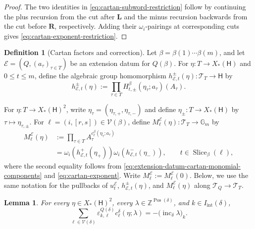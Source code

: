 \documentclass[10pt,a4paper]{article}
\newtheorem{lemma}[theorem]{Lemma}
\theoremstyle{definition}
\newtheorem{definition}[theorem]{Definition}
\theoremstyle{remark}
\newcommand{\Gm}{\mathbb G_m}
\newcommand{\torusH}{\mathsf{H}}
\newcommand{\Tcal}{\mathcal T}
\newcommand{\Vcal}{\mathcal V}
\newcommand{\eps}{\varepsilon}
\begin{document}
\begin{proof}
The two identities in \eqref{eq:cartan-subword-restriction} follow by
continuing the plus recursion from the cut after \(\mathbf L\) and the minus
recursion backwards from the cut before \(\mathbf R\), respectively.  Adding
their \(\omega_i\)-pairings at corresponding cuts gives
\eqref{eq:cartan-exponent-restriction}.
\end{proof}

\begin{definition}[Cartan factors and correction]
\label{def:extension-datum-cartan-correction}
Let \(\beta=\beta(1)\cdots\beta(m)\), and let
\(\mathcal E=(Q,(a_\tau)_{\tau\in T})\) be an extension datum for
\(Q(\beta)\).  For \(\eta:T\to X_*(\torusH)\) and \(0\le t\le m\),
define the algebraic group homomorphism
\(h_{\mathcal E,t}^\pm(\eta):\Tcal_T\to\torusH\) by
\begin{equation}
 h_{\mathcal E,t}^\pm(\eta)
 :=\prod_{\tau\in T}H_{t,\pm}^\beta(\eta_\tau;a_\tau)(A_\tau).
 \label{eq:extension-datum-cartan-monomial-components}
\end{equation}

For \(\eta:T\to X_*(\torusH)^2\), write
\(\eta_\tau=(\eta_{\tau,+},\eta_{\tau,-})\) and define
\(\eta_\pm:T\to X_*(\torusH)\) by
\(\tau\mapsto\eta_{\tau,\pm}\).  For
\(\ell=(i,[r,s])\in\Vcal(\beta)\), define
\(M_\ell^{\mathcal E}(\eta):\Tcal_T\to\Gm\) by
\begin{equation}
 \begin{aligned}
 M_\ell^{\mathcal E}(\eta)
 &:={}
 \prod_{\tau\in T}A_\tau^{c_\ell^{\beta}(\eta_\tau;a_\tau)}\\
 &=\omega_i(h_{\mathcal E,t}^+(\eta_+))
   \omega_i(h_{\mathcal E,t}^-(\eta_-)),
 \qquad t\in\operatorname{Slice}_\beta(\ell),
 \end{aligned}
 \label{eq:extension-datum-cartan-monomial}
\end{equation}
where the second equality follows from
\eqref{eq:extension-datum-cartan-monomial-components} and
\eqref{eq:cartan-exponent}.  Write
\(M_\ell^{\mathcal E}:=M_\ell^{\mathcal E}(0)\).  Below, we use the same
notation for the pullbacks of \(u_t^{\mathcal E}\),
\(h_{\mathcal E,t}^\pm(\eta)\), and \(M_\ell^{\mathcal E}(\eta)\) along
\(\Tcal_Q\to\Tcal_T\).
\end{definition}

\begin{lemma}
\label{lem:cartan-exponent-exchange-identity}
For every \(\eta\in X_*(\torusH)^2\), every
\(\lambda\in\mathbb Z^{\operatorname{Pos}(\delta)}\), and
\(k\in I_{\mathrm{int}}(\delta)\),
\begin{equation}
 \sum_{\ell\in\Vcal(\delta)}
 \eps^{Q(\delta)}_{k,\ell}c_\ell^{\delta}(\eta;\lambda)
 =-\bigl(\operatorname{inc}_\delta\lambda\bigr)_k.
 \label{eq:cartan-exponent-exchange-identity}
\end{equation}
\end{lemma}
\end{document}
